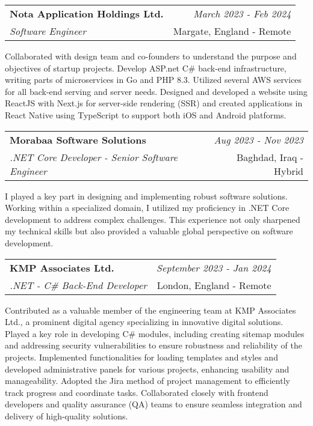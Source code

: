 \documentclass[a4paper,10pt]{article}
\makeatletter
\newcommand{\resumeSubheading}[4]{
	\vspace{0.5mm}\item
	\begin{tabular*}{0.98\textwidth}[t]{l@{\extracolsep{\fill}}r}
		\textbf{#1} & \textit{\footnotesize{#4}} \\
		\textit{\footnotesize{#3}} &  \footnotesize{#2}\\
	\end{tabular*}
	\vspace{-2.4mm}
}
\newcommand{\resumeItemListStart}{\begin{justify}\begin{itemize}[leftmargin=3ex, rightmargin=2ex, noitemsep,labelsep=1.2mm,itemsep=0mm]\small}
\newcommand{\resumeItemListEnd}{\end{itemize}\end{justify}\vspace{-2mm}}
\makeatother
\begin{document}
\vspace{-1mm}
\resumeSubheading
{Nota Application Holdings Ltd.}{Margate, England - Remote}
{Software Engineer}{March 2023 - Feb 2024}
\resumeItemListStart
Collaborated with design team and co-founders to understand the purpose and objectives of startup projects. Develop ASP.net C\# back-end infrastructure, writing parts of microservices in Go and PHP 8.3. Utilized several AWS services for all back-end serving and server needs. Designed and developed a website using ReactJS with Next.js for server-side rendering (SSR) and created applications in React Native using TypeScript to support both iOS and Android platforms.
\resumeItemListEnd

\vspace{-1mm}
\resumeSubheading
{Morabaa Software Solutions}{Baghdad, Iraq - Hybrid}
{.NET Core Developer - Senior Software Engineer}{Aug 2023 - Nov 2023}
\resumeItemListStart
I played a key part in designing and implementing robust software solutions. Working within a specialized domain, I utilized my proficiency in .NET Core development to address complex challenges. This experience not only sharpened my technical skills but also provided a valuable global perspective on software development.
\resumeItemListEnd

\vspace{-1mm}
\resumeSubheading
{KMP Associates Ltd.}{London, England - Remote}
{.NET - C\# Back-End Developer}{September 2023 - Jan 2024}
\resumeItemListStart
Contributed as a valuable member of the engineering team at KMP Associates Ltd., a prominent digital agency specializing in innovative digital solutions. Played a key role in developing C\# modules, including creating sitemap modules and addressing security vulnerabilities to ensure robustness and reliability of the projects. Implemented functionalities for loading templates and styles and developed administrative panels for various projects, enhancing usability and manageability. Adopted the Jira method of project management to efficiently track progress and coordinate tasks. Collaborated closely with frontend developers and quality assurance (QA) teams to ensure seamless integration and delivery of high-quality solutions.
\resumeItemListEnd
\end{document}
